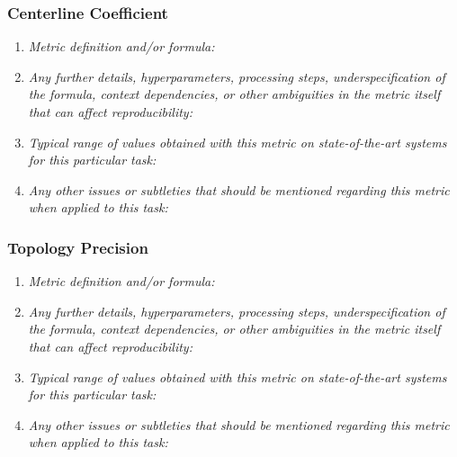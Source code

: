 \documentclass[a4paper,11pt]{article}
\begin{document}
        \subsubsection{Centerline Coefficient}
            \begin{enumerate}[label=\alph*.]
                \item \textit{Metric definition and/or formula:}
                \bigskip
                \item \textit{Any further details, hyperparameters, processing steps, underspecification of the formula, context dependencies, or other ambiguities in the metric itself that can affect reproducibility:}
                \bigskip
                \item \textit{Typical range of values obtained with this metric on state-of-the-art systems for this particular task:}
                \bigskip
                \item \textit{Any other issues or subtleties that should be mentioned regarding this metric when applied to this task:}
                \bigskip
            \end{enumerate}
        \subsubsection{Topology Precision}
            \begin{enumerate}[label=\alph*.]
                \item \textit{Metric definition and/or formula:}
                \bigskip
                \item \textit{Any further details, hyperparameters, processing steps, underspecification of the formula, context dependencies, or other ambiguities in the metric itself that can affect reproducibility:}
                \bigskip
                \item \textit{Typical range of values obtained with this metric on state-of-the-art systems for this particular task:}
                \bigskip
                \item \textit{Any other issues or subtleties that should be mentioned regarding this metric when applied to this task:}
                \bigskip
            \end{enumerate}
\end{document}
